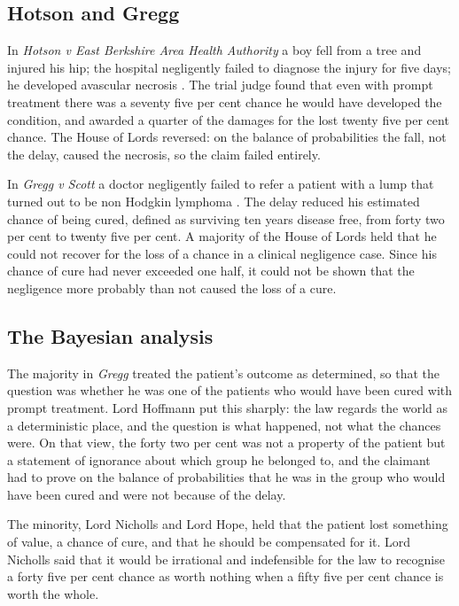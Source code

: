 \subsection{Hotson and Gregg}

In \emph{Hotson v East Berkshire Area Health Authority} a boy fell from a tree and injured his hip; the hospital negligently failed to diagnose the injury for five days; he developed avascular necrosis \citep{hotson1987}. The trial judge found that even with prompt treatment there was a seventy five per cent chance he would have developed the condition, and awarded a quarter of the damages for the lost twenty five per cent chance. The House of Lords reversed: on the balance of probabilities the fall, not the delay, caused the necrosis, so the claim failed entirely.

In \emph{Gregg v Scott} a doctor negligently failed to refer a patient with a lump that turned out to be non Hodgkin lymphoma \citep{gregg2005}. The delay reduced his estimated chance of being cured, defined as surviving ten years disease free, from forty two per cent to twenty five per cent. A majority of the House of Lords held that he could not recover for the loss of a chance in a clinical negligence case. Since his chance of cure had never exceeded one half, it could not be shown that the negligence more probably than not caused the loss of a cure.

\subsection{The Bayesian analysis}

The majority in \emph{Gregg} treated the patient's outcome as determined, so that the question was whether he was one of the patients who would have been cured with prompt treatment. Lord Hoffmann put this sharply: the law regards the world as a deterministic place, and the question is what happened, not what the chances were. On that view, the forty two per cent was not a property of the patient but a statement of ignorance about which group he belonged to, and the claimant had to prove on the balance of probabilities that he was in the group who would have been cured and were not because of the delay.

The minority, Lord Nicholls and Lord Hope, held that the patient lost something of value, a chance of cure, and that he should be compensated for it. Lord Nicholls said that it would be irrational and indefensible for the law to recognise a forty five per cent chance as worth nothing when a fifty five per cent chance is worth the whole.

